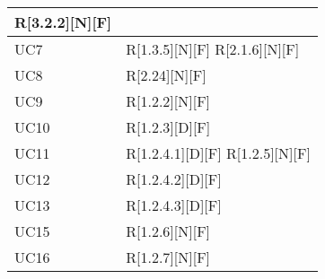 \begin{longtable}{X | X}
R[3.2.2][N][F]  \\
\hline
UC7 & R[1.3.5][N][F] \newline
R[2.1.6][N][F]  \\
\hline
UC8 & R[2.24][N][F]  \\
\hline
UC9 & R[1.2.2][N][F]  \\
\hline
UC10 & R[1.2.3][D][F]  \\
\hline
UC11 & R[1.2.4.1][D][F] \newline
R[1.2.5][N][F]  \\
\hline
UC12 & R[1.2.4.2][D][F]  \\
\hline
UC13 & R[1.2.4.3][D][F]  \\
\hline
UC15 & R[1.2.6][N][F]  \\
\hline
UC16 & R[1.2.7][N][F]  \\
\hline
\end{longtable}   